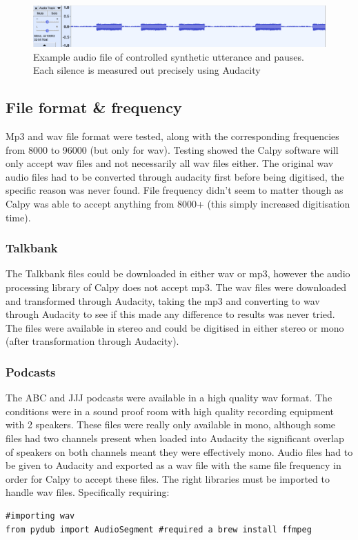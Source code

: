 \begin{figure}[htbp]
	\centerline{\includegraphics[scale=0.3]{src/main-matter/methodology/preliminary-testing/4170/022}}
	\caption{Example audio file of controlled synthetic utterance and pauses. Each silence is measured out precisely using Audacity}
	\label{flr1}
\end{figure}


\subsection{File format \& frequency}
Mp3 and wav file format were tested, along with the corresponding frequencies from 8000 to 96000 (but only for wav). Testing showed the Calpy software will only accept wav files and not necessarily all wav files either. The original wav audio files had to be converted through audacity first before being digitised, the specific reason was never found. File frequency didn't seem to matter though as Calpy was able to accept anything from 8000+ (this simply increased digitisation time). 

\subsubsection{Talkbank}
The Talkbank files could be downloaded in either wav or mp3, however the audio processing library of Calpy does not accept mp3. The wav files were downloaded and transformed through Audacity, taking the mp3 and converting to wav through Audacity to see if this made any difference to results was never tried. The files were available in stereo and could be digitised in either stereo or mono (after transformation through Audacity). 

\subsubsection{Podcasts}
The ABC and JJJ podcasts were available in a high quality wav format. The conditions were in a sound proof room with high quality recording equipment with 2 speakers. These files were really only available in mono, although some files had two channels present when loaded into Audacity the significant overlap of speakers on both channels meant they were effectively mono. Audio files had to be given to Audacity and exported as a wav file with the same file frequency in order for Calpy to accept these files. The right libraries must be imported to handle wav files. Specifically requiring:
\begin{verbatim}
#importing wav
from pydub import AudioSegment #required a brew install ffmpeg
\end{verbatim}

